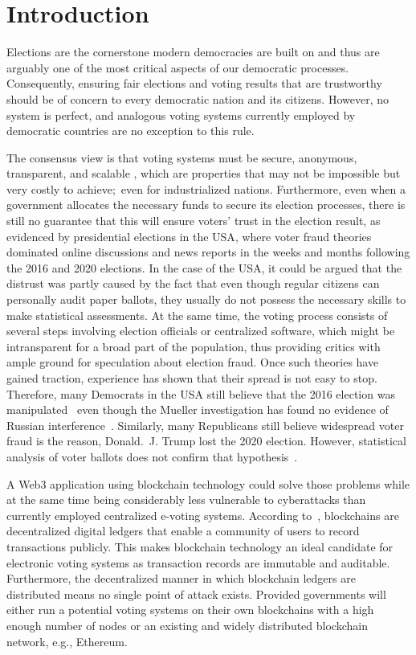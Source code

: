 \chapter{Introduction}\label{ch:intro}

Elections are the cornerstone modern democracies are built on and thus are arguably one of the most critical aspects of our democratic processes.
Consequently, ensuring fair elections and voting results that are trustworthy should be of concern to every democratic nation and its citizens.
However, no system is perfect, and analogous voting systems currently employed by democratic countries are no exception to this rule.

The consensus view is that voting systems must be secure, anonymous, transparent, and scalable
\autocites{lowry_desirable_2009}[5]{agora_agora_nodate}[9-11]{jafar_blockchain_2021},
which are properties that may not be impossible but very costly to achieve;\ even for industrialized nations.
Furthermore, even when a government allocates the necessary funds to secure its election processes, there is still no
guarantee that this will ensure voters’ trust in the election result, as evidenced by presidential elections in the \Gls{USA}, where voter fraud theories dominated online discussions and news reports in the weeks and months following the 2016 and 2020 elections.
In the case of the \Gls{USA}, it could be argued that the distrust was partly caused by the fact that even though regular citizens can personally audit paper ballots, they usually do not possess the necessary skills to make statistical assessments.
At the same time, the voting process consists of several steps involving election officials or centralized software, which might be intransparent for a broad part of the population, thus providing critics with ample ground for speculation about election fraud.
Once such theories have gained traction, experience has shown that their spread is not easy to stop.
Therefore, many Democrats in the \Gls{USA} still believe that the 2016 election was manipulated~\autocite{sinclair_its_2018}
even though the Mueller investigation has found no evidence of Russian interference~\autocite{mueller_report_2019}.
Similarly, many Republicans still believe widespread voter fraud is the reason, Donald.\ J. Trump lost the 2020 election.
However, statistical analysis of voter ballots does not confirm that hypothesis~\autocite{eggers_no_2021}.

A \Gls{Web3} application using blockchain technology could solve those problems while at the same time being considerably less vulnerable to cyberattacks than currently employed centralized e-voting systems.
According to~\textcite{yaga_blockchain_2018}, blockchains are decentralized digital ledgers that enable a community of users to record transactions publicly.
This makes blockchain technology an ideal candidate for electronic voting systems as transaction records are immutable and auditable.
Furthermore, the decentralized manner in which blockchain ledgers are distributed means no single point of attack exists.
Provided governments will either run a potential voting systems on their own blockchains with a high enough number of nodes or an existing and widely distributed blockchain network, e.g., Ethereum.

